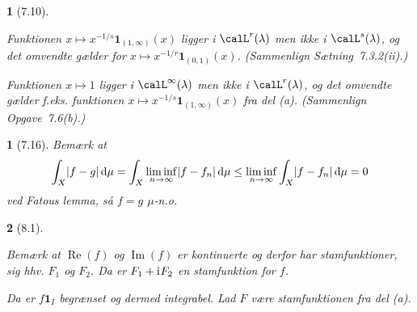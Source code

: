 \documentclass[a4paper, 11pt, article, danish, oneside]{memoir}
\title{\doctitle}
\author{\docauthor}
\newcommand{\blank}{\mathrel{\;\cdot\;}}
\newcommand{\blankifempty}[1]{\ifstrempty{#1}{\blank}{#1}}
\DeclarePairedDelimiter{\auxdelimlvert}{\lvert}{\rvert}
\newcommand{\abs}[2][]{\auxdelimlvert[#1]{\blankifempty{#2}}}
\renewcommand{\Re}{\operatorname{Re}}
\renewcommand{\Im}{\operatorname{Im}}
\newcommand{\dif}{\mathop{}\!\mathrm{d}}
\newcommand{\indicator}[1]{\mathbf{1}_{#1}}
\newcommand{\iu}{\mathrm{i}\mkern1mu}
\newcommand{\pencilsymbol}{\raisebox{-2pt}{\normalfont\PencilLeft}}
\theoremstyle{changedotcustomnumber}
\newtheorem{opgave}{\pencilsymbol}
\theoremstyle{changedotbreakcustomnumber}
\newtheorem{opgavebreak}{\pencilsymbol}
\begin{document}
\maketitle


\begin{opgavebreak}[7.10]
\begin{solutionsec}
    \item Funktionen $x \mapsto x^{-1/s} \indicator{(1,\infty)}(x)$ ligger i $\calL^r(\lambda)$ men ikke i $\calL^s(\lambda)$, og det omvendte gælder for $x \mapsto x^{-1/r} \indicator{(0,1)}(x)$. (Sammenlign Sætning~7.3.2(ii).)

    \item Funktionen $x \mapsto 1$ ligger i $\calL^\infty(\lambda)$ men ikke i $\calL^r(\lambda)$, og det omvendte gælder f.eks. funktionen $x \mapsto x^{-1/s} \indicator{(1,\infty)}(x)$ fra del (a). (Sammenlign Opgave~7.6(b).)
\end{solutionsec}
\end{opgavebreak}


\begin{opgave}[7.16]
    Bemærk at
    \begin{equation*}
        \int_X \abs{f - g} \dif\mu
            = \int_X \liminf_{n \to \infty} \abs{f - f_n} \dif\mu
            \leq \liminf_{n \to \infty} \int_X \abs{f - f_n} \dif\mu
            = 0
    \end{equation*}
    ved Fatous lemma, så $f = g$ $\mu$-n.o.
\end{opgave}


\begin{opgavebreak}[8.1]
\begin{solutionsec}
    \item Bemærk at $\Re(f)$ og $\Im(f)$ er kontinuerte og derfor har stamfunktioner, sig hhv. $F_1$ og $F_2$. Da er $F_1 + \iu F_2$ en stamfunktion for $f$.
    
    \item Da er $f \indicator{I}$ begrænset og dermed integrabel. Lad $F$ være stamfunktionen fra del (a).
\end{solutionsec}
\end{opgavebreak}
\end{document}
